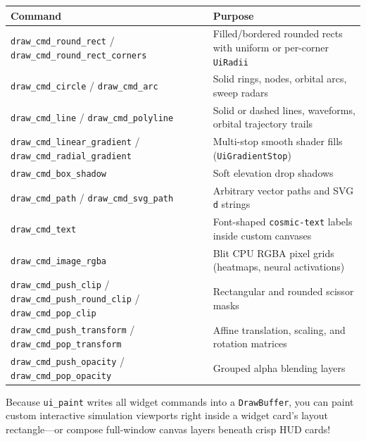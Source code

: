 \documentclass[
  english,
  oneside]{book}
\newcounter{none} %
\begin{document}
{\def\LTcaptype{none} %
\begin{longtable}[]{@{}
  >{\raggedright\arraybackslash}p{}
  >{\raggedright\arraybackslash}p{}@{}}
\toprule\noalign{}
\begin{minipage}[b]{\linewidth}\raggedright
Command
\end{minipage} & \begin{minipage}[b]{\linewidth}\raggedright
Purpose
\end{minipage} \\
\midrule\noalign{}
\endhead
\bottomrule\noalign{}
\endlastfoot
\texttt{draw\_cmd\_round\_rect} /
\texttt{draw\_cmd\_round\_rect\_corners} & Filled/bordered rounded rects
with uniform or per-corner \texttt{UiRadii} \\
\texttt{draw\_cmd\_circle} / \texttt{draw\_cmd\_arc} & Solid rings,
nodes, orbital arcs, sweep radars \\
\texttt{draw\_cmd\_line} / \texttt{draw\_cmd\_polyline} & Solid or
dashed lines, waveforms, orbital trajectory trails \\
\texttt{draw\_cmd\_linear\_gradient} /
\texttt{draw\_cmd\_radial\_gradient} & Multi-stop smooth shader fills
(\texttt{UiGradientStop}) \\
\texttt{draw\_cmd\_box\_shadow} & Soft elevation drop shadows \\
\texttt{draw\_cmd\_path} / \texttt{draw\_cmd\_svg\_path} & Arbitrary
vector paths and SVG \texttt{d} strings \\
\texttt{draw\_cmd\_text} & Font-shaped \texttt{cosmic-text} labels
inside custom canvases \\
\texttt{draw\_cmd\_image\_rgba} & Blit CPU RGBA pixel grids (heatmaps,
neural activations) \\
\texttt{draw\_cmd\_push\_clip} / \texttt{draw\_cmd\_push\_round\_clip} /
\texttt{draw\_cmd\_pop\_clip} & Rectangular and rounded scissor masks \\
\texttt{draw\_cmd\_push\_transform} / \texttt{draw\_cmd\_pop\_transform}
& Affine translation, scaling, and rotation matrices \\
\texttt{draw\_cmd\_push\_opacity} / \texttt{draw\_cmd\_pop\_opacity} &
Grouped alpha blending layers \\
\end{longtable}
}

Because \texttt{ui\_paint} writes all widget commands into a
\texttt{DrawBuffer}, you can paint custom interactive simulation
viewports right inside a widget card's layout rectangle---or compose
full-window canvas layers beneath crisp HUD cards!
\end{document}
